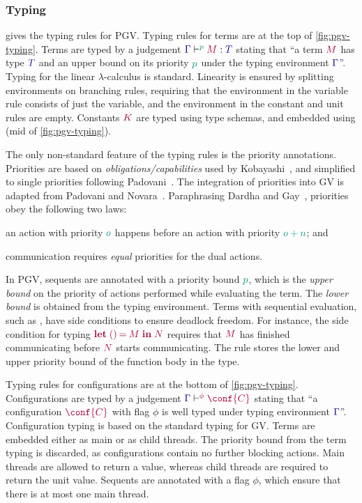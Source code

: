 \documentclass[main.tex]{subfiles}
\begin{document}
\subsubsection*{Typing}
 gives the typing rules for PGV.
Typing rules for terms are at the top of \cref{fig:pgv-typing}. Terms are typed by a judgement $\tseq[\cs{p}]{\ty{\Gamma}}{M}{T}$ stating that ``a term $\tm{M}$ has type $\ty{T}$ and an upper bound on its priority $\cs{p}$ under the typing environment $\ty{\Gamma}$''. Typing for the linear $\lambda$-calculus is standard. Linearity is ensured by splitting environments on branching rules, requiring that the environment in the variable rule consists of just the variable, and the environment in the constant and unit rules are empty. Constants $\tm{K}$ are typed using type schemas, and embedded using  (mid of \cref{fig:pgv-typing}).



The only non-standard feature of the typing rules is the priority annotations. Priorities are based on \emph{obligations/capabilities} used by Kobayashi~\cite{kobayashi06}, and simplified to single priorities following Padovani~\cite{padovani14}. The integration of priorities into GV is adapted from Padovani and Novara~\cite{padovaninovara15}. Paraphrasing Dardha and Gay~\cite{dardhagay18}, priorities obey the following two laws:
\begin{enumerate*}[label=(\roman*)]
\item an action with priority $\cs{o}$ happens before an action with priority $\cs{o+n}$; and
\item communication requires \emph{equal} priorities for the dual actions.
\end{enumerate*}

In PGV, sequents are annotated with a priority bound $\cs{p}$, which is the \emph{upper bound} on the priority of actions performed while evaluating the term. The \emph{lower bound} is obtained from the typing environment. Terms with sequential evaluation, such as , have side conditions to ensure deadlock freedom. For instance, the side condition for typing $\tm{\letunit{M}{N}}$ requires that $\tm{M}$ has finished communicating before $\tm{N}$ starts communicating. The rule  stores the lower and upper priority bound of the function body in the type.

Typing rules for configurations are at the bottom of \cref{fig:pgv-typing}. Configurations are typed by a judgement $\cseq[\phi]{\ty{\Gamma}}{\conf{C}}$ stating that ``a configuration $\tm{\conf{C}}$ with flag $\phi$ is well typed under typing environment $\ty{\Gamma}$''. Configuration typing is based on the standard typing for GV. Terms are embedded either as main or as child threads. The priority bound from the term typing is discarded, as configurations contain no further blocking actions. Main threads are allowed to return a value, whereas child threads are required to return the unit value. Sequents are annotated with a flag $\phi$, which ensure that there is at most one main thread.
\end{document}
